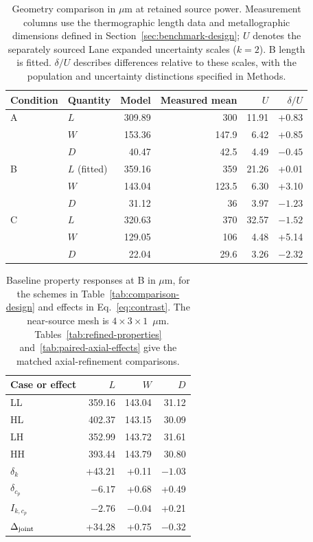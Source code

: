 \documentclass[preprint,12pt]{elsarticle}
\newcommand{\um}{\ensuremath{\mu\mathrm{m}}}
\begin{document}
\begin{table}[htbp]
\centering
\caption{Geometry comparison in \um{} at retained source power. Measurement columns use the thermographic length data and metallographic dimensions defined in Section~\ref{sec:benchmark-design}; $U$ denotes the separately sourced Lane expanded uncertainty scales ($k=2$). B length is fitted. $\delta/U$ describes differences relative to these scales, with the population and uncertainty distinctions specified in Methods.}
\label{tab:geometry}
\small
\begin{tabular}{llrrrr}
\toprule
Condition & Quantity & Model & Measured mean & $U$ & $\delta/U$\\
\midrule
A & $L$ & 309.89 & 300 & 11.91 & +0.83\\
  & $W$ & 153.36 & 147.9 & 6.42 & +0.85\\
  & $D$ & 40.47 & 42.5 & 4.49 & $-0.45$\\
B & $L$ (fitted) & 359.16 & 359 & 21.26 & +0.01\\
  & $W$ & 143.04 & 123.5 & 6.30 & +3.10\\
  & $D$ & 31.12 & 36 & 3.97 & $-1.23$\\
C & $L$ & 320.63 & 370 & 32.57 & $-1.52$\\
  & $W$ & 129.05 & 106 & 4.48 & +5.14\\
  & $D$ & 22.04 & 29.6 & 3.26 & $-2.32$\\
\bottomrule
\end{tabular}
\end{table}

\begin{table}[htbp]
\centering
\caption{Baseline property responses at B in \um{}, for the schemes in Table~\ref{tab:comparison-design} and effects in Eq.~\eqref{eq:contrast}. The near-source mesh is $4\times3\times1$~\um. Tables~\ref{tab:refined-properties} and~\ref{tab:paired-axial-effects} give the matched axial-refinement comparisons.}
\label{tab:factorial}
\begin{tabular}{lrrr}
\toprule
Case or effect & $L$ & $W$ & $D$\\
\midrule
LL & 359.16 & 143.04 & 31.12\\
HL & 402.37 & 143.15 & 30.09\\
LH & 352.99 & 143.72 & 31.61\\
HH & 393.44 & 143.79 & 30.80\\
\midrule
$\delta_k$ & +43.21 & +0.11 & $-1.03$\\
$\delta_{c_p}$ & $-6.17$ & +0.68 & +0.49\\
$I_{k,c_p}$ & $-2.76$ & $-0.04$ & +0.21\\
$\Delta_{\rm joint}$ & +34.28 & +0.75 & $-0.32$\\
\bottomrule
\end{tabular}
\end{table}
\end{document}
